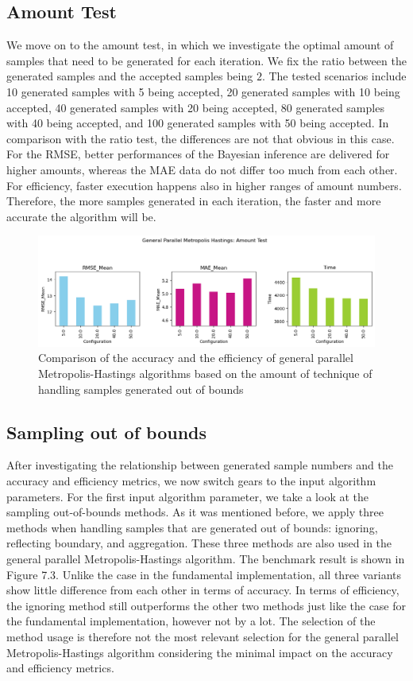 \subsection{Amount Test}
We move on to the amount test, in which we investigate the optimal amount of samples that need to be generated for each iteration. We fix the ratio between the generated samples and the accepted samples being $2$. The tested scenarios include 10 generated samples with 5 being accepted, 20 generated samples with 10 being accepted, 40 generated samples with 20 being accepted, 80 generated samples with 40 being accepted, and 100 generated samples with 50 being accepted. In comparison with the ratio test, the differences are not that obvious in this case. For the RMSE, better performances of the Bayesian inference are delivered for higher amounts, whereas the MAE data do not differ too much from each other. For efficiency, faster execution happens also in higher ranges of amount numbers. Therefore, the more samples generated in each iteration, the faster and more accurate the algorithm will be.

\begin{figure}[H]
    \centering
    \includegraphics[width=1\textwidth]{figures/gpmh/amount_test.png}
    \captionsetup{width=.8\textwidth}
    \caption{Comparison of the accuracy and the efficiency of general parallel Metropolis-Hastings algorithms based on the amount of technique of handling samples generated out of bounds}
    \label{fig:enter-label}
\end{figure}

\subsection{Sampling out of bounds}
After investigating the relationship between generated sample numbers and the accuracy and efficiency metrics, we now switch gears to the input algorithm parameters. For the first input algorithm parameter, we take a look at the sampling out-of-bounds methods. As it was mentioned before, we apply three methods when handling samples that are generated out of bounds: ignoring, reflecting boundary, and aggregation. These three methods are also used in the general parallel Metropolis-Hastings algorithm. The benchmark result is shown in Figure 7.3. Unlike the case in the fundamental implementation, all three variants show little difference from each other in terms of accuracy. In terms of efficiency, the ignoring method still outperforms the other two methods just like the case for the fundamental implementation, however not by a lot. The selection of the method usage is therefore not the most relevant selection for the general parallel Metropolis-Hastings algorithm considering the minimal impact on the accuracy and efficiency metrics.

